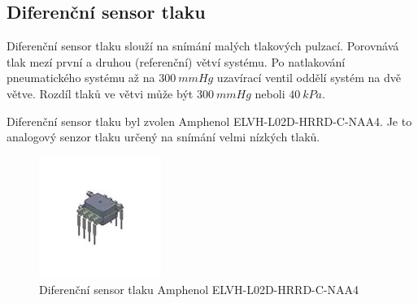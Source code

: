 \subsection{Diferenční sensor tlaku} \label{section:diff_pressure_sen}
Diferenční sensor tlaku slouží na snímání malých tlakových pulzací. Porovnává tlak mezí první a druhou (referenční) větví systému. Po natlakování pneumatického systému až na $300 \ mmHg$ uzavírací ventil oddělí systém na dvě větve. Rozdíl tlaků ve větvi může být $300 \ mmHg$ neboli $40 \ kPa$. \par
Diferenční sensor tlaku byl zvolen Amphenol ELVH-L02D-HRRD-C-NAA4. Je to analogový senzor tlaku určený na snímání velmi nízkých tlaků.
\begin{figure}[H]
    \centering
    \includegraphics[width=0.4\linewidth]{pictures/amphenol.jpg}
    \caption{Diferenční sensor tlaku Amphenol ELVH-L02D-HRRD-C-NAA4 \cite{cite:Allsensors}}
    \label{fig:amphenol}
\end{figure}


